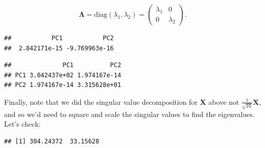 \documentclass[]{book}
\newenvironment{Shaded}{\begin{snugshade}}{\end{snugshade}}
\newcommand{\CommentTok}[1]{\textcolor[rgb]{0.56,0.35,0.01}{\textit{#1}}}
\newcommand{\DecValTok}[1]{\textcolor[rgb]{0.00,0.00,0.81}{#1}}
\newcommand{\KeywordTok}[1]{\textcolor[rgb]{0.13,0.29,0.53}{\textbf{#1}}}
\newcommand{\NormalTok}[1]{#1}
\newcommand{\OperatorTok}[1]{\textcolor[rgb]{0.81,0.36,0.00}{\textbf{#1}}}
\newcommand{\StringTok}[1]{\textcolor[rgb]{0.31,0.60,0.02}{#1}}
\theoremstyle{definition}
\theoremstyle{definition}
\theoremstyle{definition}
\theoremstyle{remark}
\begin{document}
\[
\boldsymbol \Lambda= \text{diag}(\lambda_1,\lambda_2) =  \begin{pmatrix} \lambda_1 & 0 \\ 0 & \lambda_2 \end{pmatrix}.
\]

\begin{Shaded}
\end{Shaded}

\begin{verbatim}
##           PC1           PC2 
##  2.842171e-15 -9.769963e-16
\end{verbatim}

\begin{Shaded}
\end{Shaded}

\begin{verbatim}
##              PC1          PC2
## PC1 3.042437e+02 1.974167e-14
## PC2 1.974167e-14 3.315628e+01
\end{verbatim}

Finally, note that we did the singular value decomposition for \(\mathbf X\) above not \(\frac{1}{\sqrt{10}}\mathbf X\), and so we'd need to square and scale the singular values to find the eigenvalues. Let's check:

\begin{Shaded}
\end{Shaded}

\begin{verbatim}
## [1] 304.24372  33.15628
\end{verbatim}

\begin{Shaded}
\end{Shaded}
\end{document}
